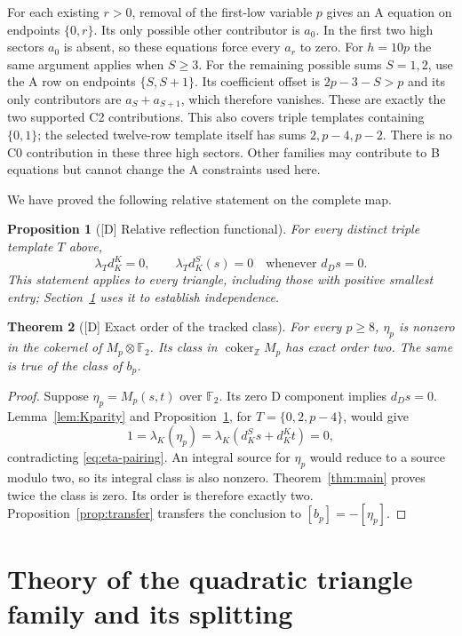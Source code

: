 \documentclass[11pt]{article}
\newtheorem{theorem}{Theorem}[section]
\newtheorem{proposition}[theorem]{Proposition}
\theoremstyle{definition}
\theoremstyle{remark}
\newcommand{\Z}{\mathbb Z}
\newcommand{\coker}{\operatorname{coker}}
\begin{document}
For each existing $r>0$, removal of the first-low variable $p$ gives
an A equation on endpoints $\{0,r\}$. Its only possible other
contributor is $a_0$. In the first two high sectors $a_0$ is absent,
so these equations force every $a_r$ to zero. For $h=10p$ the same
argument applies when $S\geq3$. For the remaining possible sums
$S=1,2$, use the A row on endpoints $\{S,S+1\}$. Its coefficient
offset is $2p-3-S>p$ and its only contributors are
$a_S+a_{S+1}$, which therefore vanishes. These are exactly the two
supported C2 contributions. This also covers triple templates containing
$\{0,1\}$; the selected twelve-row template itself has sums
$2,p-4,p-2$. There is no C0 contribution in these three high sectors.
Other families may contribute to B equations but cannot change the A
constraints used here.

We have proved the following relative statement on the complete map.
\begin{proposition}[{[D]} Relative reflection functional]\label{prop:relative-functional}
For every distinct triple template $T$ above,
\[
 \lambda_Td_K^K=0,\qquad
 \lambda_Td_K^S(s)=0\quad\text{whenever }d_Ds=0.
\]
This statement applies to every triangle, including those with positive
smallest entry; Section~\ref{sec:family} uses it to establish independence.
\end{proposition}

\begin{theorem}[{[D]} Exact order of the tracked class]\label{thm:exact-order}
For every $p\geq8$, $\eta_p$ is nonzero in the cokernel of
$M_p\otimes\mathbb F_2$. Its class in $\coker_{\Z}M_p$ has exact
order two. The same is true of the class of $b_p$.
\end{theorem}
\begin{proof}
Suppose $\eta_p=M_p(s,t)$ over $\mathbb F_2$. Its zero D component
implies $d_Ds=0$. Lemma~\ref{lem:Kparity} and
Proposition~\ref{prop:relative-functional}, for $T=\{0,2,p-4\}$,
would give
\[
 1=\lambda_K(\eta_p)=\lambda_K(d_K^Ss+d_K^Kt)=0,
\]
contradicting \eqref{eq:eta-pairing}. An integral source for $\eta_p$
would reduce to a source modulo two, so its integral class is also nonzero.
Theorem~\ref{thm:main} proves twice the class is zero. Its order is
therefore exactly two. Proposition~\ref{prop:transfer} transfers the
conclusion to $[b_p]=-[\eta_p]$.
\end{proof}

\section{Theory of the quadratic triangle family and its splitting}\label{sec:family}
\end{document}
